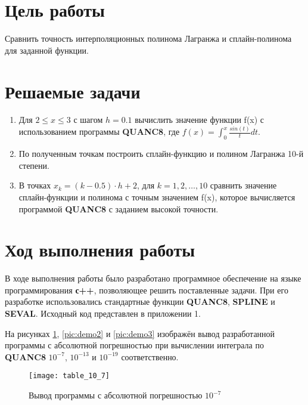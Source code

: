 




\section{Цель работы}
Сравнить точность интерполяционных полинома Лагранжа и сплайн-полинома для заданной функции.

\section{Решаемые задачи}
\begin{enumerate}

\item Для $2 \leq x \leq 3$ с шагом $h = 0.1$ вычислить значение функции f(x) с использованием программы \textbf{QUANC8}, где $f(x) = \int_{0}^{x} \frac{sin(t)}{t} dt$.

\item По полученным точкам построить сплайн-функцию и полином Лагранжа 10-й степени.

\item  В точках $x_k = (k - 0.5) \cdot h + 2$, для $k = 1, 2, \dots, 10$ сравнить значение сплайн-функции и полинома с точным значением f(x), которое вычисляется программой \textbf{QUANC8} с заданием высокой точности.
\end{enumerate}


\section{Ход выполнения работы}

В ходе выполнения работы было разработано программное обеспечение на языке программирования \textbf{с++}, позволяющее решить поставленные задачи. При его разработке использовались стандартные функции \textbf{QUANC8}, \textbf{SPLINE} и \textbf{SEVAL}. Исходный код представлен в приложении 1.

 На рисунках \ref{pic:demo1}, \ref{pic:demo2}  и \ref{pic:demo3} изображён вывод разработанной программы с абсолютной погрешностью при вычислении интеграла по \textbf{QUANC8} $10^{-7}$, $10^{-13}$ и $10^{-19}$ соответственно. 
 
\begin{figure}[H]
	\begin{center}
		\texttt{[image: table\_10\_7]}
		\caption{Вывод программы с абсолютной погрешностью $10^{-7}$}
		\label{pic:demo1} %
	\end{center}
\end{figure}

